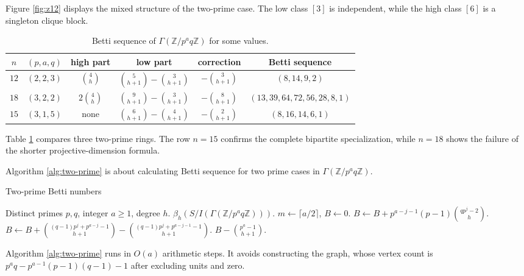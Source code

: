 \documentclass[12pt]{article}
\theoremstyle{definition}
\begin{document}
Figure \ref{fig:z12} displays the mixed structure of the two-prime case.  The low class $[3]$ is independent, while the high class $[6]$ is a singleton clique block.

\medskip

\begin{table}[H]
	\begin{center}
\begin{tabular}{cccccc}
\toprule
$n$ & $(p,a,q)$ & high part & low part & correction & Betti sequence\\
\midrule
$12$ & $(2,2,3)$ & $\binom{4}{h}$ & $\binom{5}{h+1}-\binom{3}{h+1}$ & $-\binom{3}{h+1}$ & $(8,14,9,2)$\\[4mm]
$18$ & $(3,2,2)$ & $2\binom{4}{h}$ & $\binom{9}{h+1}-\binom{3}{h+1}$ & $-\binom{8}{h+1}$ & $(13,39,64,72,56,28,8,1)$\\ [4mm]
$15$ & $(3,1,5)$ & none & $\binom{6}{h+1}-\binom{4}{h+1}$ & $-\binom{2}{h+1}$ & $(8,16,14,6,1)$\\
\bottomrule
\end{tabular}
\end{center}
\label{tab 4}
\caption{Betti sequence of $\Gamma(\mathbb{Z}/p^a q\mathbb{Z})$ for some values.}
\end{table}
Table \ref{tab 4}  compares three two-prime rings.  The row $n=15$ confirms the complete bipartite specialization, while $n=18$ shows the failure of the shorter projective-dimension formula.

\medskip

Algorithm \ref{alg:two-prime} is about calculating Betti sequence for two prime cases in $\Gamma(\mathbb{Z}/p^a q\mathbb{Z})$.
\begin{algorithm}[H]
\caption{Two-prime Betti numbers}
\label{alg:two-prime}
\begin{algorithmic}[1]
\Require Distinct primes $p,q$, integer $a\geq 1$, degree $h$.
\Ensure $\beta_h(S/I(\Gamma(\mathbb{Z}/p^a q\mathbb{Z})))$.
\State $m\gets \lceil a/2\rceil$, $B\gets 0$.
    \State $B\gets B+p^{a-j-1}(p-1)\binom{qp^j-2}{h}$.
\EndFor
{}
    \State $B\gets B+\binom{(q-1)p^j+p^{a-j}-1}{h+1}-\binom{(q-1)p^j+p^{a-j-1}-1}{h+1}$.
\EndFor
\State \Return $B-\binom{p^a-1}{h+1}$.
\end{algorithmic}
\end{algorithm}

\medskip

Algorithm \ref{alg:two-prime} runs in $O(a)$ arithmetic steps.  It avoids constructing the graph, whose vertex count is $p^a q-p^{a-1}(p-1)(q-1)-1$ after excluding units and zero.
\end{document}
